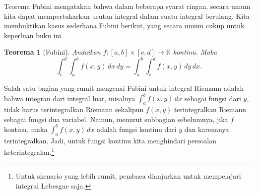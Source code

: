 \documentclass[12pt,openany]{book}
\newcommand{\R}{{\mathbb{R}}}
\theoremstyle{plain}
\newtheorem{thm}{Teorema}[section]
\theoremstyle{remark}
\theoremstyle{definition}
\theoremstyle{exercise}
\theoremstyle{example}
\begin{document}
Teorema Fubini mengatakan bahwa dalam beberapa syarat ringan, secara umum kita dapat
mempertukarkan urutan integral dalam suatu integral berulang.
Kita membuktikan kasus sederhana Fubini berikut, yang secara umum
cukup untuk keperluan buku ini.

\begin{thm}[Fubini]\label{thm:fubini}
Andaikan $f \colon [a,b] \times [c,d] \to \R$ kontinu.  Maka
\begin{equation*}
\int_c^d \int_a^b f(x,y) \, dx \, dy =
\int_a^b \int_c^d f(x,y) \, dy \, dx .
\end{equation*}
\end{thm}

Salah satu bagian yang rumit mengenai Fubini untuk integral Riemann
adalah bahwa integran dari integral luar, misalnya
$\int_a^b f(x,y) \, dx$ sebagai fungsi dari $y$, tidak harus 
terintegralkan Riemann sekalipun $f(x,y)$ terintegralkan Riemann sebagai fungsi
dua variabel.  Namun, menurut subbagian sebelumnya, jika $f$ kontinu,
maka $\int_a^b f(x,y) \, dx$ adalah fungsi kontinu dari $y$ dan karenanya
terintegralkan.  Jadi, untuk fungsi kontinu kita menghindari persoalan
keterintegralan.\footnote{Untuk skenario yang lebih rumit, pembaca
dianjurkan untuk mempelajari integral Lebesgue saja.}
\end{document}
